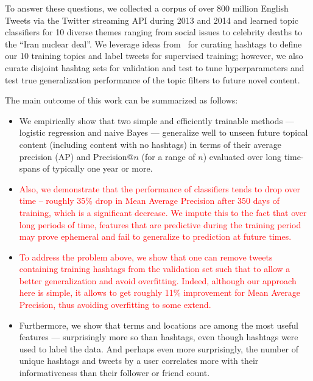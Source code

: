 To answer these questions, we collected a corpus of over 800 million English Tweets via the Twitter streaming API during 2013 and 2014 and learned topic classifiers for 10 diverse themes ranging from social issues to celebrity deaths to the ``Iran nuclear deal''.  We leverage ideas from~\cite{lin2011smoothing} for curating hashtags to define our 10 training topics and label tweets for supervised training; however, we also curate disjoint hashtag sets for validation and test to tune hyperparameters and test true generalization performance of the topic filters to future novel content. 

The main outcome of this work can be summarized as follows:
\begin{itemize}
    \item We empirically show that two simple and efficiently trainable methods ---
logistic regression and naive Bayes --- generalize well to unseen
future topical content (including content with no hashtags) in terms
of their average precision (AP) and Precision@$n$ (for a range of
$n$) evaluated over long time-spans of typically one year or more.
\item \textcolor{red}{Also, we demonstrate that the performance of classifiers tends to drop over time -- roughly 35\% drop in Mean Average Precision after 350 days of training, which is a significant decrease. We impute this to the fact that over long periods of time, features that are predictive during the training period may prove ephemeral and fail to generalize to prediction at future times. }
\item \textcolor{red}{To address the problem above, we show that one can remove tweets containing training hashtags from the validation set such that to allow a better generalization and avoid overfitting. Indeed, although our approach here is simple, it allows to get roughly 11\% improvement for Mean Average Precision, thus avoiding overfitting to some extend.}
    \item Furthermore, we show that terms and locations are among the most
useful features --- surprisingly more so than hashtags, even though
hashtags were used to label the data.  And perhaps even more
surprisingly, the number of unique hashtags and tweets by a user
correlates more with their informativeness than their follower or
friend count.  
\end{itemize}
  


